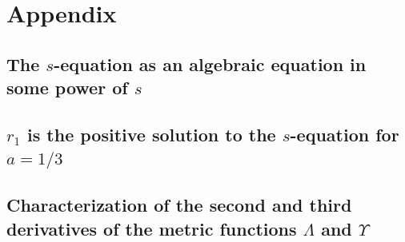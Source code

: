 \documentclass[12pt, ams, nofootinbib]{revtex4}
\def\be{\begin{equation}}
\def\ee{\end{equation}}
\def\X{\Lambda}
\def\Y{\Upsilon}
\def\bnabla{\boldsymbol{\nabla}}
\newcommand{\partd}[2]{\frac{\partial #1}{\partial #2}}   %
\theoremstyle{definition}
\begin{document}





\section{Appendix}
\label{sec:appendix}




\subsection{The $s$-equation as an algebraic equation in some power of $s$}
\label{sec:appendix-s-equation}

\subsection{$r_1$ is the positive solution to the $s$-equation for $a=1/3$}
\label{sec:appendix-r1}

\subsection{Characterization of the second and third derivatives of the metric functions $\X$ and $\Y$}
\label{sec:appendix-XY}

\end{document}
